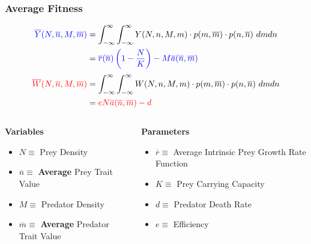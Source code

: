 \documentclass[10pt]{beamer}
\begin{document}
\begin{frame}
	\frametitle{Average Fitness}
	\begin{align*}
	{\color{blue}\overline{Y}(N, \overline{n}, M, \overline{m})} &= \int_{-\infty}^{\infty}\int_{-\infty}^{\infty} Y(N, n, M, m) \cdot p(m, \overline{m}) \cdot p(n, \overline{n})\ dm dn \\
	&= {\color{blue}\overline{r}(\overline{n})\left(1 - \frac{N}{K}\right) - M\overline{a}(\overline{n}, \overline{m})} \\[.1cm]
	{\color{red}\overline{W}(N, \overline{n}, M, \overline{m})} &= \int_{-\infty}^{\infty}\int_{-\infty}^{\infty} W(N, n, M, m) \cdot p(m, \overline{m}) \cdot p(n, \overline{n})\ dm dn \\
	&= {\color{red}eN\overline{a}(\overline{n}, \overline{m}) - d}
	\end{align*}
	\begin{columns}
		\begin{column}{0.45\textwidth}
			{\bf Variables}
			\begin{itemize}
				\item \footnotesize{\color{blue}$N \equiv $ Prey Density}
				\item {\color{blue}$\overline{n} \equiv $ {\bf Average} Prey Trait Value}
				\item {\color{red}$M \equiv $ Predator Density}
				\item {\color{red}$\overline{m} \equiv $ {\bf Average} Predator Trait  Value}
			\end{itemize}
		\end{column}
		\begin{column}{0.55\textwidth}
			{\bf Parameters}
			\begin{itemize}
				\item \footnotesize$\overline{r} \equiv $ Average Intrinsic Prey Growth Rate  Function
				\item $K \equiv $ Prey Carrying Capacity
				\item $d \equiv $ Predator Death Rate
				\item $e \equiv $ Efficiency
			\end{itemize}
		\end{column}
	\end{columns}
\end{frame}
\end{document}
